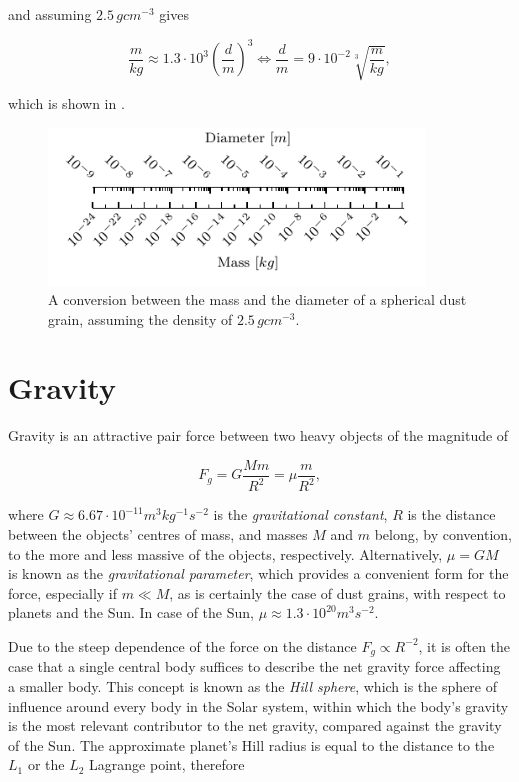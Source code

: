 and assuming $2.5 \, \si{g cm^{-3}}$ gives

\begin{equation}
    \frac{m}{\si{kg}} \approx 1.3 \cdot 10^3 \left(\frac{d}{\si{m}}\right)^3 
\Leftrightarrow 
    \frac{d}{\si{m}} = 9 \cdot 10^{-2} \sqrt[3]{\frac{m}{\si{kg}}},
\end{equation}

which is shown in .

\begin{figure}[h]
 	\centering
 	\includegraphics[width=10cm]{figures/mass_size_ruler.pdf}
 	\caption{A conversion between the mass and the diameter of a spherical dust grain, assuming the density of $2.5 \, \si{g cm^{-3}}$.}
 	\label{fig:mass_size_ruler}
\end{figure}

\section{Gravity}

Gravity is an attractive pair force between two heavy objects of the magnitude of 

\begin{equation}
    F_g = G \frac{M m}{R^2} = \mu \frac{m}{R^2},
\end{equation}

where $G \approx 6.67 \cdot 10^{-11} m^3 kg^{-1} s^{-2}$ is the \textit{gravitational constant}, $R$ is the distance between the objects' centres of mass, and masses $M$ and $m$ belong, by convention, to the more and less massive of the objects, respectively. Alternatively, $\mu = G M$ is known as the \textit{gravitational parameter}, which provides a convenient form for the force, especially if $m \ll M$, as is certainly the case of dust grains, with respect to planets and the Sun. In case of the Sun, $\mu \approx 1.3 \cdot 10^{20} \si{m^3 s^{-2}}$.

Due to the steep dependence of the force on the distance $F_g \propto R^{-2}$, it is often the case that a single central body suffices to describe the net gravity force affecting a smaller body. This concept is known as the \textit{Hill sphere}, which is the sphere of influence around every body in the Solar system, within which the body's gravity is the most relevant contributor to the net gravity, compared against the gravity of the Sun. The approximate planet's Hill radius is equal to the distance to the $L_1$ or the $L_2$ Lagrange point, therefore 

